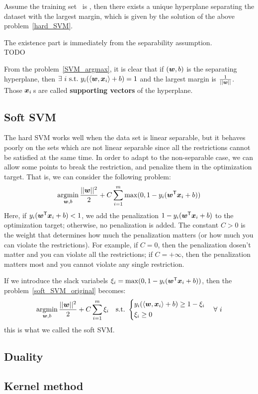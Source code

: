\begin{thm}
    Assume the training set \dataset\ is , then there exists a unique hyperplane separating
    the dataset with the largest margin, which is given by the solution of the above 
    problem~\eqref{hard_SVM}.
\end{thm}
\begin{pf}
    The existence part is immediately from the separability assumption.\\
    TODO
\end{pf}

\begin{re}
    From the problem~\eqref{SVM_argmax}, it is clear that if $(\boldsymbol{w}, b)$ is the separating hyperplane, then
    $\exists~i\ \text{s.t.\ } y_i(\langle\boldsymbol{w}, \boldsymbol{x}_i\rangle + b) = 1$ and the largest margin is $\frac{1}{||\boldsymbol{w}||}$.
    Those $\boldsymbol{x}_i$\,s are called \textbf{supporting vectors} of the hyperplane.
\end{re}

\subsection{Soft SVM}
The hard SVM works well when the data set is linear separable, but it behaves poorly on the sets which are not
linear separable since all the restrictions cannot be satisfied at the same time. In order to adapt to the 
non-separable case, we can allow some points to break the restriction, and penalize them in the optimization
target. That is, we can consider the following problem:
\begin{equation}\label{soft_SVM_original}
    \operatorname*{argmin}_{\boldsymbol{w}, b} \frac{||\boldsymbol{w}||^2}{2} + C\sum_{i=1}^{m}\max(0, 1 - y_i({\boldsymbol{w}}^\mathsf{T}\boldsymbol{x}_i +b))
\end{equation}
Here, if $y_i({\boldsymbol{w}}^\mathsf{T}\boldsymbol{x}_i +b) < 1$, we add the penalization $1 - y_i({\boldsymbol{w}}^\mathsf{T}\boldsymbol{x}_i +b)$ to the 
optimization target; otherwise, no penalization is added. The constant $C > 0$ is the weight that determines 
how much the penalization matters (or how much you can violate the restrictions). For example, if $C = 0$, 
then the penalization dosen't matter and you can violate all the restrictions; if $C = +\infty$, then the 
penalization matters most and you cannot violate any single restriction.\par
If we introduce the slack variabels $\xi_i = \max(0, 1 - y_i({\boldsymbol{w}}^\mathsf{T}\boldsymbol{x}_i +b))$, then
the problem~\eqref{soft_SVM_original} becomes:
\begin{equation}\label{soft_SVM}
    \operatorname*{argmin}_{\boldsymbol{w}, b} \frac{||\boldsymbol{w}||^2}{2} + C\sum_{i=1}^{m}\xi_i\quad\text{s.t.\ }\left\{
    \begin{aligned}
    & y_i(\langle\boldsymbol{w}, \boldsymbol{x}_i\rangle + b) \geq 1 - \xi_i\\
    & \xi_i \geq 0 
    \end{aligned}\right.
    \quad\forall~i
\end{equation}
this is what we called the soft SVM\@.

\subsection{Duality}

\subsection{Kernel method}